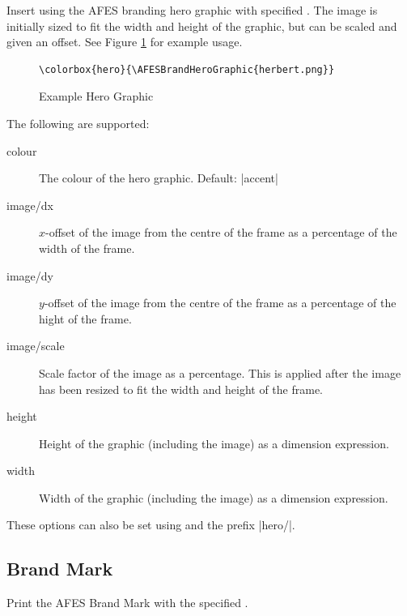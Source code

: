 \documentclass[a4paper]{l3doc}
\begin{document}
\begin{function}{\AFESBrandHeroGraphic}
  \begin{syntax}
  \end{syntax}
  Insert  using the AFES branding hero graphic with specified
  . The image is initially sized to fit the width and height of
  the graphic, but can be scaled and given an offset. See Figure
  \ref{herographic} for example usage.
\end{function}

\begin{figure}
  \begin{lstlisting}
\colorbox{hero}{\AFESBrandHeroGraphic{herbert.png}}
  \end{lstlisting}

  \centering\setlength{\fboxsep}{5mm}%
  \colorbox{hero}{}
  \caption{Example Hero Graphic}\label{herographic}
\end{figure}

The following  are supported:

\begin{description}
  \item[colour] The colour of the hero graphic. Default: |accent|
  \item[image/dx] $x$-offset of the image from the centre of the frame as a
    percentage of the width of the frame.
  \item[image/dy] $y$-offset of the image from the centre of the frame as a
    percentage of the hight of the frame.
  \item[image/scale] Scale factor of the image as a percentage. This is
    applied after the image has been resized to fit the width and height of
    the frame.
  \item[height] Height of the graphic (including the image) as a dimension
    expression.
  \item[width] Width of the graphic (including the image) as a dimension
    expression.
\end{description}

These options can also be set using  and the prefix
|hero/|.

\subsection{Brand Mark}

\begin{function}{\AFESBrandMark}
  \begin{syntax}
  \end{syntax}
  Print the AFES Brand Mark with the specified .
\end{function}
\end{document}
